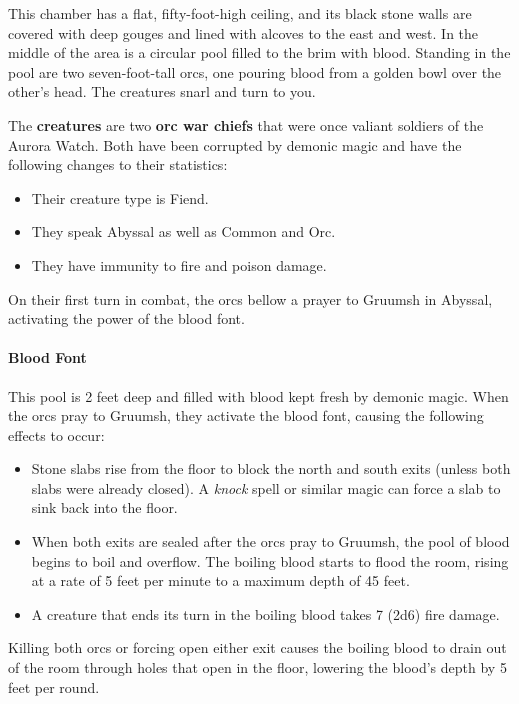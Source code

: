 \documentclass[letterpaper, 11pt, bg=full, twocolumn]{dndbook}
\begin{document}
\begin{DndReadAloud}
This chamber has a flat, fifty-foot-high ceiling, and its black stone walls are covered with deep gouges and lined with alcoves to the east and west. In the middle of the area is a circular pool filled to the brim with blood. Standing in the pool are two seven-foot-tall orcs, one pouring blood from a golden bowl over the other's head. The creatures snarl and turn to you.
\end{DndReadAloud}

The \textbf{creatures} are two \textbf{orc war chiefs} that were once valiant soldiers of the Aurora Watch. Both have been corrupted by demonic magic and have the following changes to their statistics:

\begin{itemize}
\item Their creature type is Fiend.
\item They speak Abyssal as well as Common and Orc.
\item They have immunity to fire and poison damage.
\end{itemize}

On their first turn in combat, the orcs bellow a prayer to Gruumsh in Abyssal, activating the power of the blood font.

\paragraph{Blood Font}

This pool is 2 feet deep and filled with blood kept fresh by demonic magic. When the orcs pray to Gruumsh, they activate the blood font, causing the following effects to occur:

\begin{itemize}
\item Stone slabs rise from the floor to block the north and south exits (unless both slabs were already closed). A \textit{knock} spell or similar magic can force a slab to sink back into the floor.
\item When both exits are sealed after the orcs pray to Gruumsh, the pool of blood begins to boil and overflow. The boiling blood starts to flood the room, rising at a rate of 5 feet per minute to a maximum depth of 45 feet.
\item A creature that ends its turn in the boiling blood takes 7 (2d6) fire damage.
\end{itemize}

Killing both orcs or forcing open either exit causes the boiling blood to drain out of the room through holes that open in the floor, lowering the blood's depth by 5 feet per round.
\end{document}
